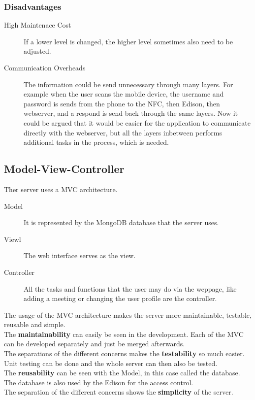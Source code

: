 \documentclass[a4paper,12pt,titlepage]{article}
\begin{document}
\subsubsection{Disadvantages}
\begin{description}
\item[High Maintenace Cost] If a lower level is changed, the higher level sometimes also need to be adjusted.
\item[Communication Overheads] The information could be send  unnecessary through many layers. For example when the user scans the mobile device, the username and password is sends from the phone to the NFC, then Edison, then webserver, and a respond is send back through the same layers. Now it could be argued that it would be easier for the application to communicate directly with the webserver, but all the layers inbetween performs additional tasks in the process, which is needed.

\end{description}

\subsection{Model-View-Controller}
Ther server uses a MVC architecture.
\begin{description}
\item[Model] It is represented by the MongoDB database that the server uses.
\item[Viewl] The web interface serves as the view.
\item[Controller] All the tasks and functions that the user may do via the weppage, like adding a meeting or changing the user profile are the controller.
\end{description}
The usage of the MVC architecture makes the server more maintainable, testable, reusable and simple.\\ 
 The \textbf{maintainability} can easily be seen in the development. Each of the MVC can be developed separately and just be merged afterwards.\\
The separations of the different concerns makes the \textbf{testability} so much easier. Unit testing can be done and the whole server can then also be tested.\\
The \textbf{reusability} can be seen with the Model, in this case called the database. The database is also used by the Edison for the access control.\\
 The separation of the different concerns shows the \textbf{simplicity} of the server. 
\end{document}
